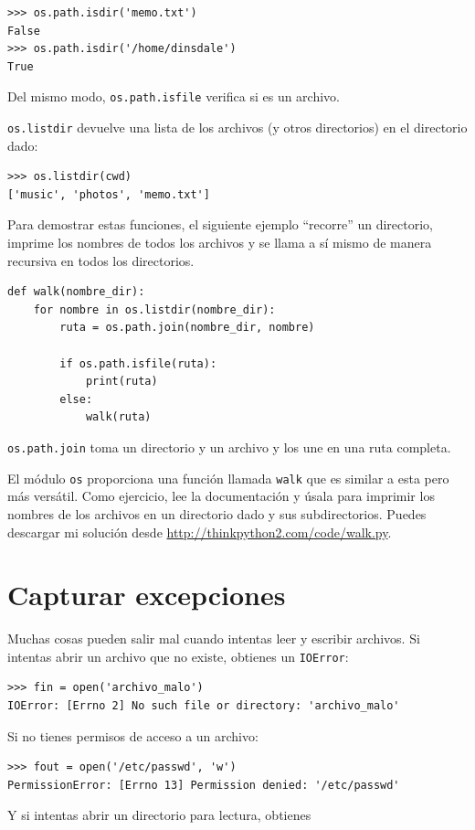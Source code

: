\documentclass[10pt]{book}
\begin{document}
\begin{verbatim}
>>> os.path.isdir('memo.txt')
False
>>> os.path.isdir('/home/dinsdale')
True
\end{verbatim}
%
Del mismo modo, {\tt os.path.isfile} verifica si es un archivo.

{\tt os.listdir} devuelve una lista de los archivos (y otros directorios)
en el directorio dado:

\begin{verbatim}
>>> os.listdir(cwd)
['music', 'photos', 'memo.txt']
\end{verbatim}
%
Para demostrar estas funciones, el siguiente ejemplo
``recorre'' un directorio, imprime
los nombres de todos los archivos y se llama a sí mismo de manera recursiva en
todos los directorios.

\begin{verbatim}
def walk(nombre_dir):
    for nombre in os.listdir(nombre_dir):
        ruta = os.path.join(nombre_dir, nombre)

        if os.path.isfile(ruta):
            print(ruta)
        else:
            walk(ruta)
\end{verbatim}
%
{\tt os.path.join} toma un directorio y un archivo y los une
en una ruta completa.

El módulo {\tt os} proporciona una función llamada {\tt walk} que es
similar a esta pero más versátil.  Como ejercicio, lee la
documentación y úsala para imprimir los nombres de los archivos
en un directorio dado y sus subdirectorios.  Puedes descargar mi solución desde
\url{http://thinkpython2.com/code/walk.py}.


\section{Capturar excepciones}
\label{catch}

Muchas cosas pueden salir mal cuando intentas leer y escribir
archivos.  Si intentas abrir un archivo que no existe, obtienes un
{\tt IOError}:

\begin{verbatim}
>>> fin = open('archivo_malo')
IOError: [Errno 2] No such file or directory: 'archivo_malo'
\end{verbatim}
%
Si no tienes permisos de acceso a un archivo:

\begin{verbatim}
>>> fout = open('/etc/passwd', 'w')
PermissionError: [Errno 13] Permission denied: '/etc/passwd'
\end{verbatim}
%
Y si intentas abrir un directorio para lectura, obtienes
\end{document}
